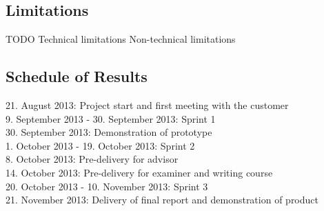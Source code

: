\documentclass{report}
\begin{document}
\subsection{Limitations} \label{subsec:limitations}
TODO
Technical limitations
Non-technical limitations

\subsection{Schedule of Results} \label{subsec:schedule_of_results}
21. August 2013: Project start and first meeting with the customer\\
9. September 2013 - 30. September 2013: Sprint 1\\
30. September 2013: Demonstration of prototype\\
1. October 2013 - 19. October 2013: Sprint 2\\
8. October 2013: Pre-delivery for advisor\\
14. October 2013: Pre-delivery for examiner and writing course\\
20. October 2013 - 10. November 2013: Sprint 3\\
21. November 2013: Delivery of final report and demonstration of product

\end{document}
